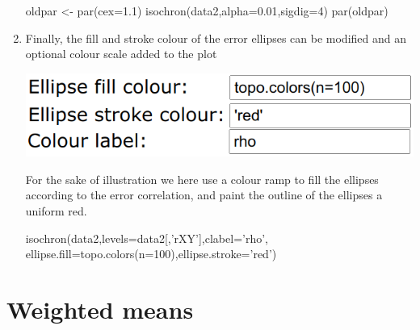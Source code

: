 \begin{refsection}
\begin{enumerate}
\begin{script}
oldpar <- par(cex=1.1)
isochron(data2,alpha=0.01,sigdig=4)
par(oldpar)
\end{script}

\item Finally, the fill and stroke colour of the error ellipses can be
  modified and an optional colour scale added to the plot

\noindent\begin{minipage}[t]{.45\linewidth}
  \strut\vspace*{-\baselineskip}\newline
  \includegraphics[width=\linewidth]{../figures/OtherRegressionFillStroke.png}
\end{minipage}
\begin{minipage}[t]{.55\linewidth}
For the sake of illustration we here use a colour ramp to fill the
ellipses according to the error correlation, and paint the outline of
the ellipses a uniform red.
\end{minipage}

\begin{script}
isochron(data2,levels=data2[,'rXY'],clabel='rho',
         ellipse.fill=topo.colors(n=100),ellipse.stroke='red')
\end{script}
  
\end{enumerate}

\section{Weighted means}\label{sec:OtherWeightedMean}


\end{refsection}
